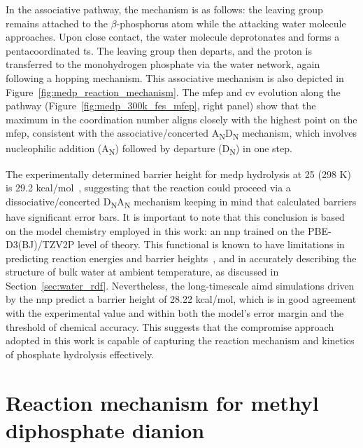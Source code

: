 In the associative pathway, the mechanism is as follows: the leaving group remains attached to the $\beta$-phosphorus atom while the attacking water molecule approaches. Upon close contact, the water molecule deprotonates and forms a pentacoordinated \ac{ts}. The leaving group then departs, and the proton is transferred to the monohydrogen phosphate via the water network, again following a hopping mechanism. This associative mechanism is also depicted in Figure~\ref{fig:medp_reaction_mechanism}. The \ac{mfep} and \ac{cv} evolution along the pathway (Figure~\ref{fig:medp_300k_fes_mfep}, right panel) show that the maximum in the coordination number aligns closely with the highest point on the \ac{mfep}, consistent with the associative/concerted A\textsubscript{N}D\textsubscript{N} mechanism, which involves nucleophilic addition (A\textsubscript{N}) followed by departure (D\textsubscript{N}) in one step.

The experimentally determined barrier height for \ac{medp} hydrolysis at 25 (298 K) is 29.2 kcal/mol~\citep{wolfendenDegreesDifficultyWaterConsuming2006}, suggesting that the reaction could proceed via a dissociative/concerted D\textsubscript{N}A\textsubscript{N} mechanism keeping in mind that calculated barriers have significant error bars. It is important to note that this conclusion is based on the model chemistry employed in this work: an \ac{nnp} trained on the PBE-D3(BJ)/TZV2P level of theory. This functional is known to have limitations in predicting reaction energies and barrier heights~\citep{burschBestPracticeDFTProtocols2022}, and in accurately describing the structure of bulk water at ambient temperature, as discussed in Section~\ref{sec:water_rdf}. Nevertheless, the long-timescale \ac{aimd} simulations driven by the \ac{nnp} predict a barrier height of 28.22 kcal/mol, which is in good agreement with the experimental value and within both the model's error margin and the threshold of chemical accuracy. This suggests that the compromise approach adopted in this work is capable of capturing the reaction mechanism and kinetics of phosphate hydrolysis effectively.



\section{Reaction mechanism for methyl diphosphate dianion}

